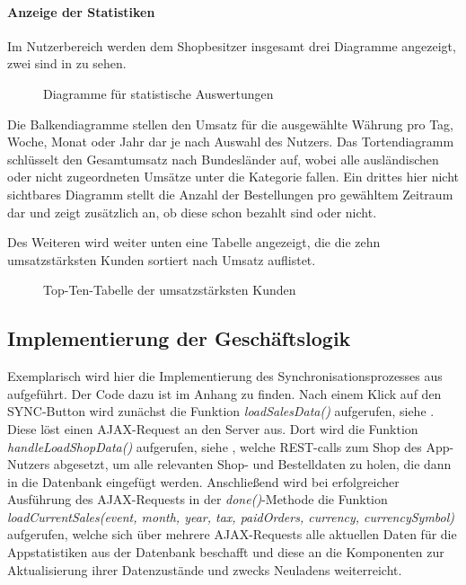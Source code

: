 \paragraph{Anzeige der Statistiken}
Im Nutzerbereich werden dem Shopbesitzer insgesamt drei Diagramme angezeigt, zwei sind in  zu sehen.
\begin{figure}[htb]
\centering
{}
\caption{Diagramme für statistische Auswertungen}
\label{fig:umsatz}
\end{figure}
Die Balkendiagramme stellen den Umsatz für die ausgewählte Währung pro Tag, Woche, Monat oder Jahr dar je nach Auswahl des Nutzers. Das Tortendiagramm schlüsselt den Gesamtumsatz nach Bundesländer auf, wobei alle ausländischen oder nicht zugeordneten Umsätze unter die Kategorie  fallen. Ein drittes hier nicht sichtbares Diagramm stellt die Anzahl der Bestellungen pro gewähltem Zeitraum dar und zeigt zusätzlich an, ob diese schon bezahlt sind oder nicht.

Des Weiteren wird weiter unten eine Tabelle angezeigt, die die zehn umsatzstärksten Kunden sortiert nach Umsatz auflistet.
\begin{figure}[htb]
\centering
{}
\caption{Top-Ten-Tabelle der umsatzstärksten Kunden}
\label{fig:umsatz}
\end{figure}

\subsection{Implementierung der Geschäftslogik}
\label{sec:ImplementierungGeschaeftslogik}

Exemplarisch wird hier die Implementierung des Synchronisationsprozesses aus  aufgeführt. Der Code dazu ist im Anhang zu finden. Nach einem Klick auf den SYNC-Button wird zunächst die Funktion \textit{loadSalesData()} aufgerufen, siehe . Diese löst einen AJAX-Request an den Server aus. Dort wird die Funktion \textit{handleLoadShopData()} aufgerufen, siehe , welche REST-calls zum Shop des App-Nutzers abgesetzt, um alle relevanten Shop- und Bestelldaten zu holen, die dann in die Datenbank eingefügt werden.
Anschließend wird bei erfolgreicher Ausführung des AJAX-Requests in der \textit{done()}-Methode die Funktion \textit{loadCurrentSales(event, month, year, tax, paidOrders, currency, currencySymbol)} aufgerufen, welche sich über mehrere AJAX-Requests alle aktuellen Daten für die Appstatistiken aus der Datenbank beschafft und diese an die Komponenten zur Aktualisierung ihrer Datenzustände und zwecks Neuladens weiterreicht.  


